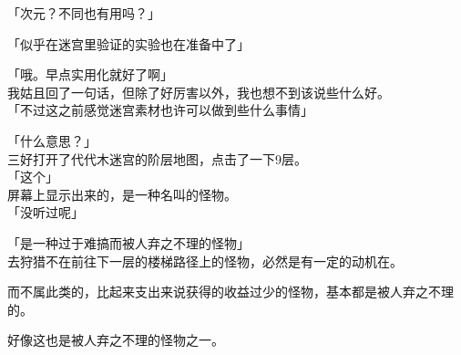 「次元？不同也有用吗？」

「似乎在迷宫里验证的实验也在准备中了」

「哦。早点实用化就好了啊」\\

我姑且回了一句话，但除了好厉害以外，我也想不到该说些什么好。\\

「不过这之前感觉迷宫素材也许可以做到些什么事情」

「什么意思？」\\

三好打开了代代木迷宫的阶层地图，点击了一下9层。\\

「这个」\\

屏幕上显示出来的，是一种名叫的怪物。\\

「没听过呢」

「是一种过于难搞而被人弃之不理的怪物」\\

去狩猎不在前往下一层的楼梯路径上的怪物，必然是有一定的动机在。

而不属此类的，比起来支出来说获得的收益过少的怪物，基本都是被人弃之不理的。

好像这也是被人弃之不理的怪物之一。\\

